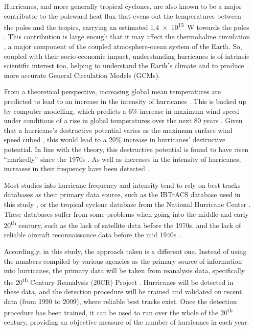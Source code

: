 \documentclass[pdftex,12pt,a4paper]{report}
\newcommand{\ts}{\textsuperscript}
\begin{document}
Hurricanes, and more generally tropical cyclones, are also known to be a major contributor to the
poleward heat flux that evens out the temperatures between the poles and the tropics, carrying an
estimated \SI{1.4e15}{W} towards the poles \parencite{emanuelContribution2001}. This
contribution is large enough that it may affect the thermohaline circulation
\parencite{hu2009effect}, a major component of the coupled atmosphere-ocean system of the Earth. So,
coupled with their socio-economic impact, understanding hurricanes is of intrinsic scientific
interest too, helping to understand the Earth's climate and to produce more accurate General
Circulation Models (GCMs).

From a theoretical perspective, increasing global mean temperatures are predicted to lead to an
increase in the intensity of hurricanes \parencite{emanuel1987dependence}. This is backed up by
computer modelling, which predicts a 6\% increase in maximum wind speed under conditions of a rise
in global temperatures over the next 80 years \parencite{knutson2004impact}. Given that a
hurricane's destructive potential varies as the maximum surface wind speed cubed
\parencite{emanuel2005increasing}, this would lead to a 20\% increase in hurricanes' destructive
potential. In line with the theory, this destructive potential is found to have risen ``markedly''
since the 1970s \parencite{emanuel2005increasing}. As well as increases in the intensity of
hurricanes, increases in their frequency have been detected \parencite{goldenberg2001recent,
webster2005changes, holland2007heightened}.

Most studies into hurricane frequency and intensity tend to rely on best tracks databases as their
primary data source, such as the IBTrACS database used in this study
\parencite{knappInternational2010}, or the tropical cyclone database from the National Hurricane
Center \parencite[HURDAT;][]{jarvinen1984tropical}. These databases suffer from some problems when
going into the middle and early 20\ts{th} century, such as the lack of satellite data before the
1970s, and the lack of reliable aircraft reconnaissance data before the mid 1940s
\parencite{chang2007number}. 

Accordingly, in this study, the approach taken is a different one.  Instead of using the numbers
compiled by various agencies as the primary source of information into hurricanes, the primary data
will be taken from reanalysis data, specifically the 20\ts{th} Century Reanalysis (20CR) Project
\parencite{compoTwentieth2011}. Hurricanes will be detected in these data, and the detection
procedure will be trained and validated on recent data (from 1990 to 2009), where reliable best
tracks exist. Once the detection procedure has been trained, it can be used to run over the whole of
the 20\ts{th} century, providing an objective measure of the number of hurricanes in each year.
\end{document}
